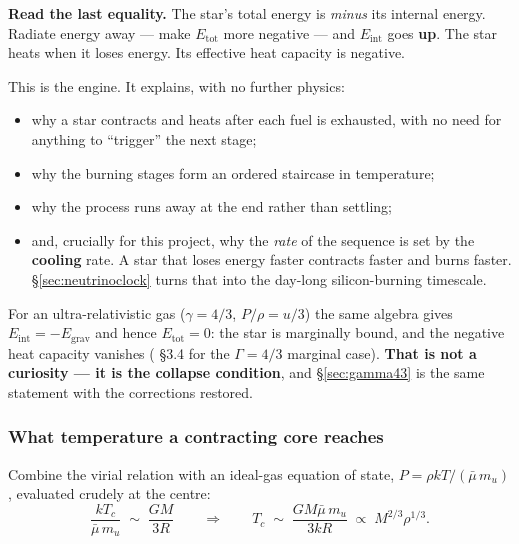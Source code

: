 \textbf{Read the last equality.} The star's total energy is \emph{minus} its
internal energy. Radiate energy away --- make $E_{\mathrm{tot}}$ more negative
--- and $E_{\mathrm{int}}$ goes \textbf{up}. The star heats when it loses
energy. Its effective heat capacity is negative.

This is the engine. It explains, with no further physics:

\begin{itemize}
\item why a star contracts and heats after each fuel is exhausted, with no need
  for anything to ``trigger'' the next stage;
\item why the burning stages form an ordered staircase in temperature;
\item why the process runs away at the end rather than settling;
\item and, crucially for this project, why the \emph{rate} of the sequence is
  set by the \textbf{cooling} rate. A star that loses energy faster contracts
  faster and burns faster. \S\ref{sec:neutrinoclock} turns that into the
  day-long silicon-burning timescale.
\end{itemize}

For an ultra-relativistic gas ($\gamma = 4/3$, $P/\rho = u/3$) the same algebra
gives $E_{\mathrm{int}} = -E_{\mathrm{grav}}$ and hence $E_{\mathrm{tot}} = 0$:
the star is marginally bound, and the negative heat capacity vanishes
(\citealt{shapiro1983} \S3.4 for the $\Gamma = 4/3$ marginal case).
\textbf{That is not a curiosity --- it is the collapse condition}, and
\S\ref{sec:gamma43} is the same statement with the corrections restored.

\subsubsection{What temperature a contracting core reaches}
\label{sec:tcore}

Combine the virial relation with an ideal-gas equation of state,
$P = \rho k T/(\bar\mu\, m_u)$, evaluated crudely at the centre:
%
\begin{equation}
\frac{k T_c}{\bar\mu\, m_u} \;\sim\; \frac{G M}{3R}
\qquad\Longrightarrow\qquad
T_c \;\sim\; \frac{G M \bar\mu\, m_u}{3kR}
\;\propto\; M^{2/3}\rho^{1/3}.
\label{eq:tcore}
\end{equation}

